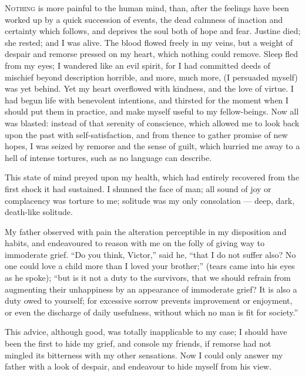 \textsc{Nothing} is more painful to the
human mind, than, after the feelings
have been worked up by a quick succession
of events, the dead calmness of
inaction and certainty which follows,
and deprives the soul both of hope and
fear. Justine died; she rested; and I
was alive. The blood flowed freely in
my veins, but a weight of despair and
remorse pressed on my heart, which
nothing could remove. Sleep fled from
my eyes; I wandered like an evil spirit,
for I had committed deeds of mischief
beyond description horrible, and more,
much more, (I persuaded myself) was
yet behind. Yet my heart overflowed
with kindness, and the love of virtue.
I had begun life with benevolent intentions,
and thirsted for the moment
when I should put them in practice,
and make myself useful to my fellow-beings.
Now all was blasted: instead
of that serenity of conscience, which
allowed me to look back upon the past
with self-satisfaction, and from thence
to gather promise of new hopes, I was
seized by remorse and the sense of
guilt, which hurried me away to a hell
of intense tortures, such as no language
can describe.

This state of mind preyed upon my
health, which had entirely recovered
from the first shock it had sustained.
I shunned the face of man; all sound
of joy or complacency was torture to
me; solitude was my only consolation --- deep,
dark, death-like solitude.

My father observed with pain the alteration
perceptible in my disposition and
habits, and endeavoured to reason with
me on the folly of giving way to immoderate
grief. ``Do you think, Victor,''
said he, ``that I do not suffer also? No
one could love a child more than I
loved your brother;'' (tears came into
his eyes as he spoke); ``but is it not a
duty to the survivors, that we should
refrain from augmenting their unhappiness
by an appearance of immoderate
grief? It is also a duty owed to yourself;
for excessive sorrow prevents improvement
or enjoyment, or even the
discharge of daily usefulness, without
which no man is fit for society.''

This advice, although good, was totally
inapplicable to my case; I should
have been the first to hide my grief, and
console my friends, if remorse had not
mingled its bitterness with my other
sensations. Now I could only answer
my father with a look of despair, and endeavour
to hide myself from his view.

